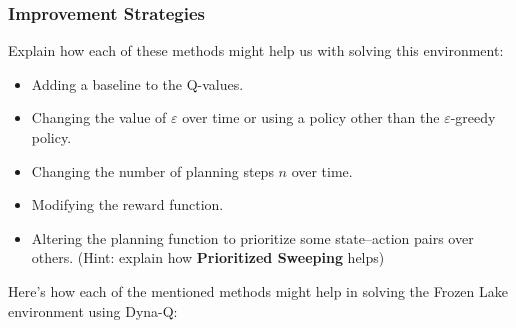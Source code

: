 \subsubsection{Improvement Strategies}
Explain how each of these methods might help us with solving this environment:
\begin{itemize} 
    \item Adding a baseline to the Q-values. 
    \item Changing the value of $\varepsilon$ over time or using a policy other than the $\varepsilon$-greedy policy. 
    \item Changing the number of planning steps $n$ over time. 
    \item Modifying the reward function. 
    \item Altering the planning function to prioritize some state–action pairs over others. (Hint: explain how \textbf{Prioritized Sweeping} helps) 
\end{itemize}
Here's how each of the mentioned methods might help in solving the Frozen Lake environment using Dyna-Q:

